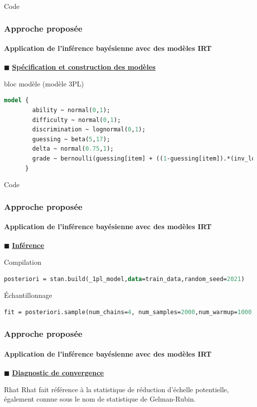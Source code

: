 \documentclass[aspectratio=169,professionalfonts, 12pt]{beamer}
\begin{document}
\begin{frame}[fragile]{Code}
  \frametitle{Approche proposée}
  \framesubtitle{Application de l'inférence bayésienne avec des modèles IRT}
  \justifying 
  \(\displaystyle \blacksquare \) \textbf{\underline{Spécification et construction des modèles}}
  \begin{minipage}{\textwidth}
  \begin{block}{bloc modèle (modèle 3PL)}
    \begin{lstlisting}[language=Stan,basicstyle=\scriptsize,framesep=4.5mm,framexleftmargin=2.5mm,tabsize=2]
      model {
        ability ~ normal(0,1);         
        difficulty ~ normal(0,1);   
        discrimination ~ lognormal(0,1);
        guessing ~ beta(5,17);
        delta ~ normal(0.75,1);
        grade ~ bernoulli(guessing[item] + ((1-guessing[item]).*(inv_logit(discrimination[item] .* (ability[subject] - (difficulty[item] + delta))))));
      }
    \end{lstlisting}
  \end{block}
  \end{minipage}
\end{frame}


\begin{frame}[fragile]{Code}
  \frametitle{Approche proposée}
  \framesubtitle{Application de l'inférence bayésienne avec des modèles IRT}
  \(\displaystyle \blacksquare \) \textbf{\underline{ Inférence }}

  \justifying 
  \begin{minipage}{\textwidth}
  \begin{block}{Compilation}
    \begin{lstlisting}[language=Stan,basicstyle=\small,framesep=4.5mm,framexleftmargin=2.5mm,tabsize=2]
      posteriori = stan.build(_1pl_model,data=train_data,random_seed=2021)
    \end{lstlisting}
  \end{block}
  \begin{block}{\'Echantillonnage}
    \begin{lstlisting}[language=Stan,basicstyle=\small,framesep=4.5mm,framexleftmargin=2.5mm,tabsize=2]
      fit = posteriori.sample(num_chains=4, num_samples=2000,num_warmup=1000,num_thin=1)
    \end{lstlisting}
  \end{block}
  \end{minipage}
\end{frame}

\begin{frame}
  \frametitle{Approche proposée}
  \framesubtitle{Application de l'inférence bayésienne avec des modèles IRT}
  \(\displaystyle \blacksquare \) \textbf{\underline{ Diagnostic de convergence }} \\
  \justifying 
  \begin{minipage}{\textwidth}
  \begin{block}{Rhat}
    Rhat fait référence à la statistique de réduction d'échelle potentielle, également connue sous le nom de statistique de Gelman-Rubin.
  \end{block}
  \end{minipage}
 
\end{frame}
\end{document}
